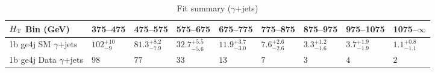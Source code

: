 \documentclass[8pt]{article}
\def\scalht{\mbox{$H_{\rm{T}}$}\xspace}
\newcommand\T{\rule{0pt}{2.6ex}}
\begin{document}
\begin{table}[ht!]
\caption{Fit summary ($\gamma$+jets)}
\label{tab:ensemble-summary}
\centering
\begin{tabular}{ lllllllll }

\hline
\scalht Bin (GeV)       & 375--475                       & 475--575                       & 575--675                       & 675--775                       & 775--875                       & 875--975                       & 975--1075                      & 1075--$\infty$                 \\ [1.000000ex]
\hline
1b ge4j SM $\gamma$+jets\T & $102^{+10}_{-9}$               & $81.3^{+8.2}_{-7.9}$           & $32.7^{+5.5}_{-5.6}$           & $11.9^{+3.7}_{-3.0}$           & $7.6^{+2.6}_{-2.6}$            & $3.3^{+1.2}_{-1.6}$            & $3.7^{+1.9}_{-1.9}$            & $1.1^{+0.8}_{-1.1}$            \\ 
1b ge4j Data $\gamma$+jets\T & $98$                           & $77$                           & $33$                           & $13$                           & $7$                            & $3$                            & $4$                            & $2$                            \\ 
\hline

\end{tabular}
\end{table}
\end{document}
